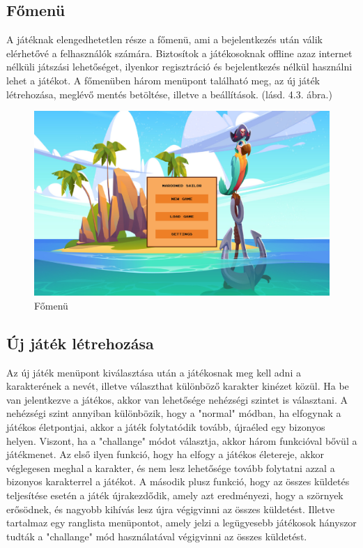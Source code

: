 \subsection{Főmenü}

\indent \indent A játéknak elengedhetetlen része a főmenü, ami a bejelentkezés után válik elérhetővé a felhasználók számára. Biztosítok a játékosoknak offline azaz internet nélküli játszási lehetőséget, ilyenkor regisztráció és bejelentkezés nélkül használni lehet a játékot.
A főmenüben három menüpont található meg, az új játék létrehozása, meglévő mentés betöltése, illetve a beállítások. (lásd. 4.3. ábra.)   



\begin{figure}[H]
    \centering
    \includegraphics[width=15.0truecm]{images/mainmenu.png}
    \caption{Főmenü
    \cite{Főmenü}}
    \label{fig:Főmenü}
\end{figure}



\subsection{Új játék létrehozása}
\indent \indent Az új játék menüpont kiválasztása után a játékosnak meg kell adni a karakterének a nevét, illetve választhat különböző karakter kinézet közül. Ha be van jelentkezve a játékos, akkor van lehetősége nehézségi szintet is választani.
A nehézségi szint annyiban különbözik, hogy a "normal" módban, ha elfogynak a játékos életpontjai, akkor a játék folytatódik tovább, újraéled egy bizonyos helyen. Viszont, ha a "challange"  módot választja, akkor három funkcióval bővül a játékmenet. Az első ilyen funkció, hogy ha elfogy a játékos életereje, akkor véglegesen meghal a karakter, és nem lesz lehetősége tovább folytatni azzal a bizonyos karakterrel a játékot. A második plusz funkció, hogy az összes küldetés teljesítése esetén a játék újrakezdődik, amely azt eredményezi, hogy a szörnyek erősödnek, és nagyobb kihívás lesz újra végigvinni az összes küldetést. Illetve tartalmaz egy ranglista menüpontot, amely jelzi a legügyesebb játékosok hányszor tudták a "challange" mód használatával végigvinni az összes küldetést. 

